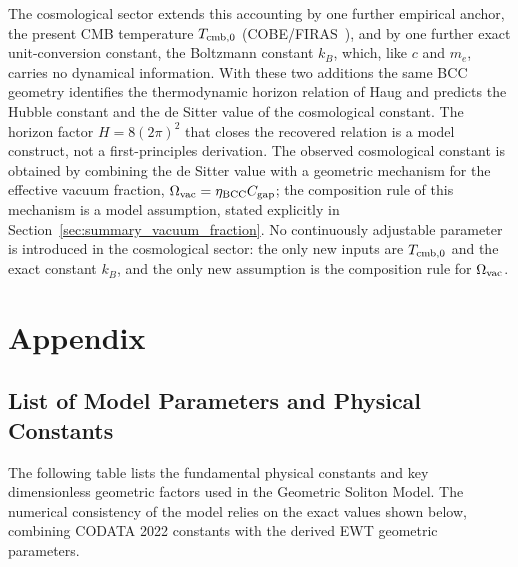 \documentclass[10pt,a4paper]{article}
\begin{document}
The cosmological sector extends this accounting by one further
empirical anchor, the present CMB temperature \(T_{\rm cmb,0}\)
(COBE/FIRAS~\cite{Fixsen2009}), and by one further exact
unit-conversion constant, the Boltzmann constant \(k_B\), which,
like \(c\) and \(m_e\), carries no dynamical information. With these two
additions the same BCC geometry identifies the thermodynamic horizon
relation of Haug and predicts the Hubble constant and the de Sitter
value of the cosmological constant. The horizon factor
\(H = 8(2\pi)^2\) that closes the recovered relation is a model
construct, not a first-principles derivation. The observed
cosmological constant is obtained by combining the de Sitter value
with a geometric mechanism for the effective vacuum fraction,
\(\Omega_{\rm vac} = \eta_{\rm BCC} C_{\rm gap}\); the composition
rule of this mechanism is a model assumption, stated explicitly in
Section~\ref{sec:summary_vacuum_fraction}. No continuously
adjustable parameter is introduced in the cosmological sector: the
only new inputs are \(T_{\rm cmb,0}\) and the exact constant
\(k_B\), and the only new assumption is the composition rule for
\(\Omega_{\rm vac}\).

\clearpage

\appendix
\section{Appendix}
\subsection{List of Model Parameters and Physical Constants}

The following table lists the fundamental physical constants and key dimensionless geometric factors used in the Geometric Soliton Model. The numerical consistency of the model relies on the exact values shown below, combining CODATA 2022 constants with the derived EWT geometric parameters.
\end{document}
